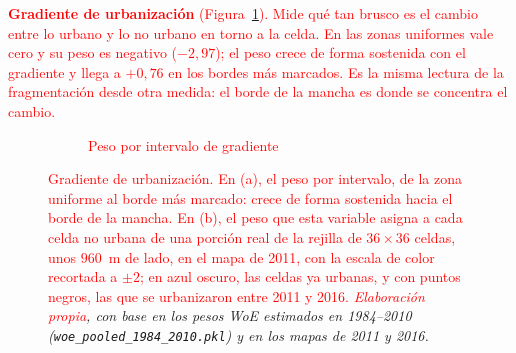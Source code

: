\textcolor{red}{\textbf{Gradiente de urbanización} (Figura~\ref{fig:woe-gradiente}). Mide qué tan brusco es el
cambio entre lo urbano y lo no urbano en torno a la celda. En las zonas
uniformes vale cero y su peso es negativo ($-2{,}97$); el peso crece de forma
sostenida con el gradiente y llega a $+0{,}76$ en los bordes más marcados. Es
la misma lectura de la fragmentación desde otra medida: el borde de la mancha
es donde se concentra el cambio.}

\begin{figure}[htbp]
  \centering
  \shorthandoff{<>}%
  \begin{subfigure}[b]{0.56\linewidth}
  \centering
  \caption{\textcolor{red}{Peso por intervalo de gradiente}}
  \end{subfigure}\hfill
  \begin{subfigure}[b]{0.40\linewidth}
  \centering
  \end{subfigure}
  \caption{\textcolor{red}{Gradiente de urbanización. En (a), el peso por intervalo, de la zona uniforme al borde más marcado: crece de forma sostenida hacia el borde de la mancha. En (b), el peso que esta variable asigna a cada celda no urbana de una porción real de la rejilla de $36\times36$ celdas, unos $960$~m de lado, en el mapa de 2011, con la escala de color recortada a $\pm2$; en azul oscuro, las celdas ya urbanas, y con puntos negros, las que se urbanizaron entre 2011 y 2016.} \textit{\textcolor{red}{Elaboración propia}, con base en los pesos WoE estimados en 1984--2010 (\texttt{woe\_pooled\_1984\_2010.pkl}) y en los mapas de 2011 y 2016.}}
  \label{fig:woe-gradiente}
\end{figure}


